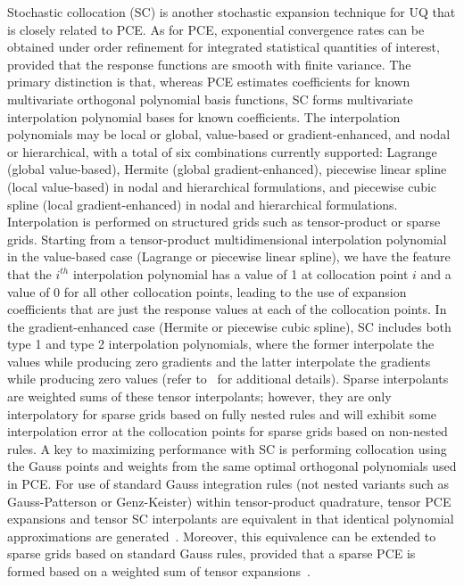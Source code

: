Stochastic collocation (SC) is another stochastic expansion technique
for UQ that is closely related to PCE.  As for PCE, exponential
convergence rates can be obtained under order refinement for
integrated statistical quantities of interest, provided that the
response functions are smooth with finite variance.  The primary
distinction is that, whereas PCE estimates coefficients for known
multivariate orthogonal polynomial basis functions, SC forms
multivariate interpolation polynomial bases for known coefficients.
The interpolation polynomials may be local or global, value-based or
gradient-enhanced, and nodal or hierarchical, with a total of six
combinations currently supported: Lagrange (global value-based),
Hermite (global gradient-enhanced), piecewise linear spline (local
value-based) in nodal and hierarchical formulations, and piecewise
cubic spline (local gradient-enhanced) in nodal and hierarchical
formulations.  Interpolation is performed on structured grids such as
tensor-product or sparse grids.  Starting from a tensor-product
multidimensional interpolation polynomial in the value-based case
(Lagrange or piecewise linear spline), we have the feature that the
$i^{th}$ interpolation polynomial has a value of 1 at collocation
point $i$ and a value of 0 for all other collocation points, leading
to the use of expansion coefficients that are just the response values
at each of the collocation points.  In the gradient-enhanced case
(Hermite or piecewise cubic spline), SC includes both type 1 and type
2 interpolation polynomials, where the former interpolate the values
while producing zero gradients and the latter interpolate the
gradients while producing zero values (refer to~\cite{TheoMan} for
additional details).  Sparse interpolants are weighted sums of these
tensor interpolants;
however, they are only interpolatory for sparse grids based on fully 
nested rules and will exhibit some interpolation error at the 
collocation points for sparse grids based on non-nested rules.
A key to maximizing performance with SC is performing collocation
using the Gauss points and weights from the same optimal orthogonal
polynomials used in PCE.  
For use of standard Gauss integration rules (not nested variants such
as Gauss-Patterson or Genz-Keister) within tensor-product quadrature,
tensor PCE expansions and tensor SC interpolants are equivalent in
that identical polynomial approximations are
generated~\cite{ConstTPQ}.  Moreover, this equivalence can be extended
to sparse grids based on standard Gauss rules, provided that a sparse
PCE is formed based on a weighted sum of tensor expansions~\cite{ConstSSG}.

